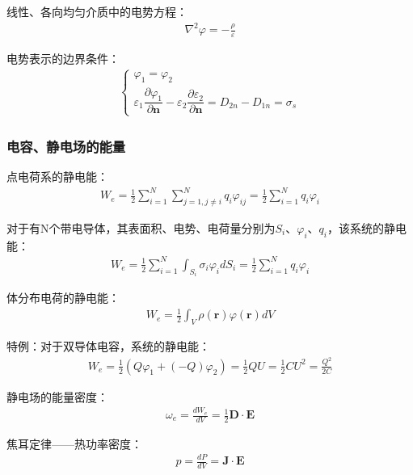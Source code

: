 \documentclass[withoutpreface,bwprint]{cumcmthesis} %
\begin{document}
线性、各向均匀介质中的电势方程：
\begin{align}
    \nabla^2 \varphi = -\frac{\rho}{\varepsilon}
\end{align}

电势表示的边界条件：
\begin{align}
    \begin{cases}
        \varphi_1 = \varphi_2\\
        \varepsilon_1 \dfrac{\partial \varphi_1}{\partial \boldsymbol{n}} - \varepsilon_2 \dfrac{\partial \varepsilon_2}{\partial \boldsymbol{n}} = D_{2n} - D_{1n} = \sigma_s
    \end{cases}
\end{align}


\subsubsection{电容、静电场的能量}
点电荷系的静电能：
\begin{align}
    W_e = \frac{1}{2} \sum_{i = 1}^{N} \sum_{j = 1, j\neq i}^{N} q_i \varphi_{ij} = \frac{1}{2} \sum_{i=1}^{N} q_i \varphi_i
\end{align}

对于有N个带电导体，其表面积、电势、电荷量分别为$S_i$、$\varphi_i$、$q_i$，该系统的静电能：
\begin{align}
    W_e = \frac{1}{2} \sum_{i = 1}^{N} \int_{S_i} \sigma_i \varphi_i dS_i = \frac{1}{2} \sum_{i=1}^{N} q_i \varphi_i
\end{align}

体分布电荷的静电能：
\begin{align}
    W_e = \frac{1}{2} \int_V \rho(\boldsymbol{r}) \varphi(\boldsymbol{r}) dV 
\end{align}

特例：对于双导体电容，系统的静电能：
\begin{align}
    W_e = \frac{1}{2} (Q \varphi_1 + (-Q)\varphi_2) = \frac{1}{2} QU = \frac{1}{2} CU^2 = \frac{Q^2}{2C}
\end{align}

静电场的能量密度：
\begin{align}
    \omega_e = \frac{dW_e}{dV} = \frac{1}{2} \boldsymbol{D} \cdot \boldsymbol{E}
\end{align}

焦耳定律——热功率密度：
\begin{align}
    p = \frac{dP}{dV} = \boldsymbol{J} \cdot \boldsymbol{E}
\end{align}
\end{document}
